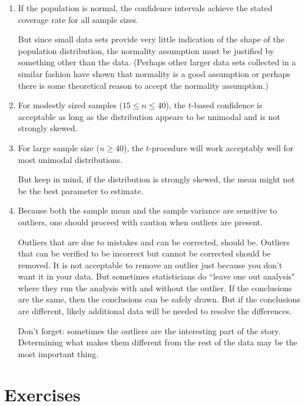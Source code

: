 \documentclass[twoside]{book}\usepackage[]{graphicx}\usepackage[]{xcolor}
\begin{document}
\begin{enumerate}
	\item If the population is normal, the confidence intervals achieve
		the stated coverage rate for all sample sizes.

		But since small data sets provide very little indication
		of the shape of the population distribution, the normality assumption
		must be justified by something other than the data.
		(Perhaps other larger data sets collected in a similar fashion 
		have shown that normality is a good assumption or perhaps there
		is some theoretical reason to accept the normality assumption.)

	\item
		For modestly sized samples ($15 \le n \le 40$), the $t$-based 
		confidence is acceptable as long as the distribution appears 
		to be unimodal and is not strongly skewed.

	\item
		For large sample size ($n \ge 40$), the $t$-procedure will work acceptably
		well for most unimodal distributions.

		But keep in mind, if the distribution is strongly skewed, the 
		mean might not be the best parameter to estimate.

	\item
		Because both the sample mean and the sample variance are sensitive
		to outliers, one should proceed with caution when outliers 
		are present.

		Outliers that are due to mistakes and can be corrected, should be.  Outliers that can be verified
		to be incorrect but cannot be corrected should be removed.  It is not
		acceptable to remove an outlier just because you don't want it in your data.
		But sometimes statisticians do ``leave one out analysis" where they run the 
		analysis with and without the outlier.  If the conclusions are the same, then
		the conclusions can be safely drawn.  But if the conclusions are different,
		likely additional data will be needed to resolve the differences.

		Don't forget: sometimes the outliers are the interesting part of the story.
		Determining what makes them different from the rest of the data may be 
		the most important thing.

\end{enumerate}



\newpage
\section{Exercises}
\end{document}
